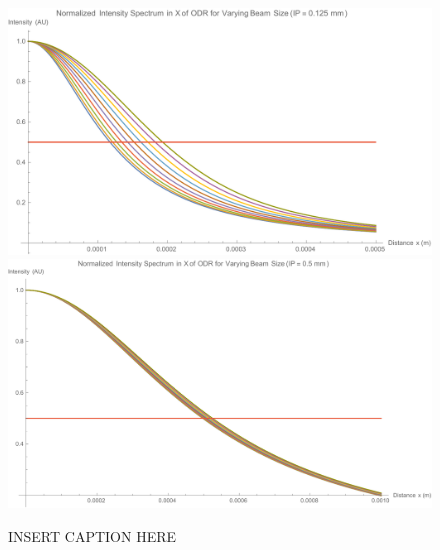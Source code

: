 \documentclass[12pt]{article}
\begin{document}
\begin{figure}
\begin{center}
\includegraphics[scale=0.5]{figures/ODR_Norm_IntensityX_125.PDF}
\includegraphics[scale=0.5]{figures/ODR_Norm_IntensityX_500.PDF}
\caption{INSERT CAPTION HERE}
\end{center}
\end{figure}
\end{document}
